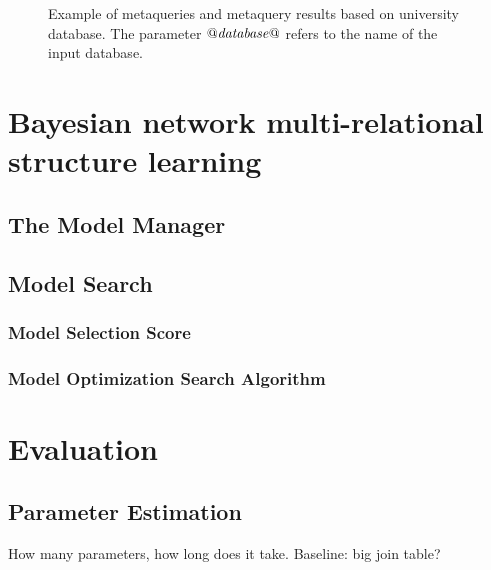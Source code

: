 \documentclass{acm_proc_article-sp}
\begin{document}
\begin{figure}[htb]
\begin{center}
\caption{Example of metaqueries and metaquery results based on university database. The parameter $\it{@database@}$ refers to the name of the input database. 
~\label{fig:meta-query} }
\end{center}
\end{figure}

\section{Bayesian network multi-relational structure learning}

\subsection{The Model Manager}

\subsection{Model Search}

\subsubsection{Model Selection Score}

\subsubsection{Model Optimization Search Algorithm}

\section{Evaluation}

\subsection{Parameter Estimation}

How many parameters, how long does it take.
Baseline: big join table?
\end{document}
